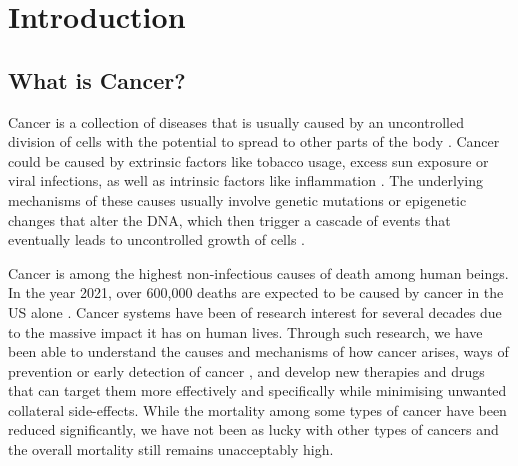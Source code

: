 \chapter{Introduction}

\section{What is Cancer?}
Cancer is a collection of diseases that is usually caused by an uncontrolled division of cells with the potential to spread to other parts of the body \cite{cancergov}. Cancer could be caused by extrinsic factors like tobacco usage, excess sun exposure or viral infections, as well as intrinsic factors like inflammation \cite{Trichopoulos,Coussens}. The underlying mechanisms of these causes usually involve genetic mutations or epigenetic changes that alter the DNA, which then trigger a cascade of events that eventually leads to uncontrolled growth of cells \cite{Moolgavkar,Gronbaek}.

Cancer is among the highest non-infectious causes of death among human beings. In the year 2021, over 600,000 deaths are expected to be caused by cancer in the US alone \cite{cancer_stats}. Cancer systems have been of research interest for several decades due to the massive impact it has on human lives. Through such research, we have been able to understand the causes and mechanisms of how cancer arises, ways of prevention or early detection of cancer \cite{Loeb,Elmore,Goodman}, and develop new therapies and drugs that can target them more effectively and specifically while minimising unwanted collateral side-effects. While the mortality among some types of cancer have been reduced significantly, we have not been as lucky with other types of cancers and the overall mortality still remains unacceptably high.

